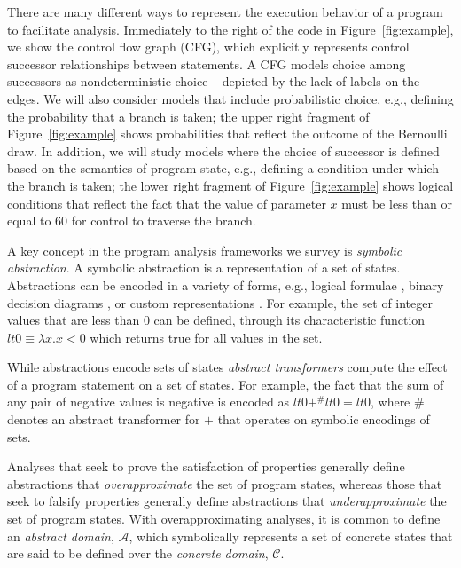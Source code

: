 There are many different ways to represent the execution behavior
of a program to facilitate analysis.  Immediately to the right of
the code in Figure~\ref{fig:example}, we show the control flow graph (CFG),
which explicitly represents control successor relationships between
statements.  A CFG models choice among successors as nondeterministic
choice -- depicted by the lack of labels on the edges.
We will also consider models that include probabilistic choice,
e.g., defining the probability that a branch is taken; the
upper right fragment of Figure~\ref{fig:example} shows probabilities
that reflect the outcome of the Bernoulli draw.
In addition, we will study models where the
choice of successor is defined based on the semantics
of program state, e.g., defining a condition under which the branch
is taken; the lower right fragment of Figure~\ref{fig:example}
shows logical conditions that 
reflect the fact that the value of parameter $x$ must be
less than or equal to $60$ for control to traverse the branch.

A key concept in the program analysis frameworks we survey is
\textit{symbolic abstraction}.  A symbolic abstraction is a 
representation of a set of states.  Abstractions can be encoded
in a variety of forms, e.g., logical formulae \cite{thakur2012bilateral}, binary
decision diagrams \cite{bryant1992symbolic}, or custom representations \cite{bagnara2008parma}.  For example, the set of integer values that
are less than $0$ can be defined, through its characteristic
function $lt0 \equiv \lambda x.x<0$ which returns true for all values in the set.

While abstractions encode sets of states \textit{abstract transformers}
compute the effect of a program statement on a set of states.  For example,
the fact that the sum of any pair of negative values is negative is
encoded as $lt0 +^\# lt0 = lt0$, where $\#$ denotes an abstract transformer
for $+$ that operates on symbolic encodings of sets.

Analyses that seek to prove the satisfaction of properties generally
define abstractions that \textit{overapproximate} the set of program
states, whereas those that seek to falsify properties generally define
abstractions that \textit{underapproximate} the set of program states.
With overapproximating analyses, it is common to define an \textit{abstract
domain}, $\mathcal{A}$, 
which symbolically represents a set of concrete states that
are said to be defined over the \textit{concrete domain}, $\mathcal{C}$.


